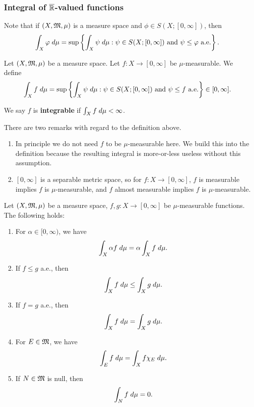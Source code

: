 \documentclass[a4paper]{article}
\begin{document}
\subsubsection*{Integral of $\overline{\mathbb{R}}$-valued functions}

Note that if $(X, \mathfrak{M}, \mu)$ is a measure space and 
$\phi \in S(X; [0, \infty])$, then 
\[
\int_X \varphi \; d\mu = 
\sup \left\{ \int_X \psi \; d\mu : 
\psi \in S(X; [0, \infty]) \text{ and $\psi \leq \varphi$
a.e.} \right\}.
\]

\begin{defi}
  Let $(X, \mathfrak{M}, \mu)$ be a measure space. Let 
  $f : X \to [0, \infty]$ be $\mu$-measurable. We 
  define 
  \[
  \int_X f \; d\mu = 
  \sup \left\{ \int_X \psi \; d\mu: 
  \text{$\psi \in S(X; [0, \infty])$ and 
  $\psi \leq f$ a.e.} \right\} 
  \in [0, \infty].
  \]

  We say $f$ is \textbf{integrable} if $\int_X f \; d \mu < 
  \infty$.
\end{defi}

\begin{remark}
There are two remarks with regard to the definition 
above.
\begin{enumerate}
  \item In principle we do not need $f$ to be $\mu$-measurable
  here. We build this into the definition because the 
  resulting integral is more-or-less useless without this 
  assumption. 
  \item $[0, \infty]$ is a separable metric space,
  so for $f : X \to [0, \infty]$, 
  $f$ is measurable implies $f$ is $\mu$-measurable,
  and $f$ almost measurable implies $f$ is $\mu$-measurable.
\end{enumerate}
\end{remark}

\begin{thm}
Let $(X, \mathfrak{M}, \mu)$ be a measure space, $f, g : X \to [0, \infty]$
be $\mu$-measurable functions. The following holds: 
\begin{enumerate}
  \item For $\alpha \in [0, \infty)$, we have 
  \[
  \int_X \alpha f \; d \mu = \alpha \int_X f \; d \mu.
  \]
  \item If $f \leq g$ a.e., then 
  \[
  \int_X f \; d \mu \leq \int_X g \; d \mu.
  \]
  \item If $f = g$ a.e., then 
  \[
  \int_X f \; d \mu = \int_X g \; d \mu.
  \]
  \item For $E \in \mathfrak{M}$, we have 
  \[
  \int_E f \; d \mu = \int_X f \chi_E \; d \mu.
  \]
  \item If $N \in \mathfrak{M}$ is null, then 
  \[
  \int_N f \; d \mu = 0.
  \]
\end{enumerate}
\end{thm}
\end{document}
